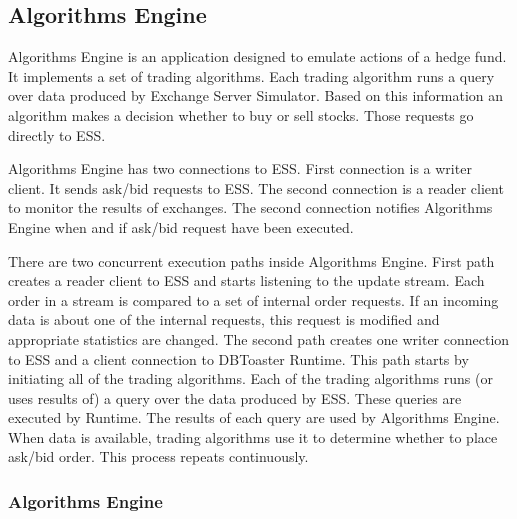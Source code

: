 \documentclass[14pt]{article}
\begin{document}
\subsection{Algorithms Engine}

Algorithms Engine is an application designed to emulate actions of a hedge fund. It implements a set of trading algorithms. Each trading algorithm runs a query over data produced by Exchange Server Simulator. Based on this information an algorithm makes a decision whether to buy or sell stocks. Those requests go directly to ESS. 

Algorithms Engine has two connections to ESS. First connection is a writer client. It sends ask/bid requests to ESS. The second connection is a reader client to monitor the results of exchanges. The second connection notifies Algorithms Engine when and if ask/bid request have been executed. 

There are two concurrent execution paths inside Algorithms Engine. First path creates a reader client to ESS and starts listening to the update stream. Each order in a stream is compared to a set of internal order requests. If an incoming data is about one of the internal requests, this request is modified and appropriate statistics are changed. The second path creates one writer connection to ESS and a client connection to DBToaster Runtime. This path starts by initiating all of the trading algorithms. Each of the trading algorithms runs (or uses results of) a query over the data produced by ESS. These queries are executed by Runtime. The results of each query are used by Algorithms Engine. When data is available, trading algorithms use it to determine whether to place ask/bid order. This process repeats continuously. 



\subsubsection{Algorithms Engine}
\end{document}
